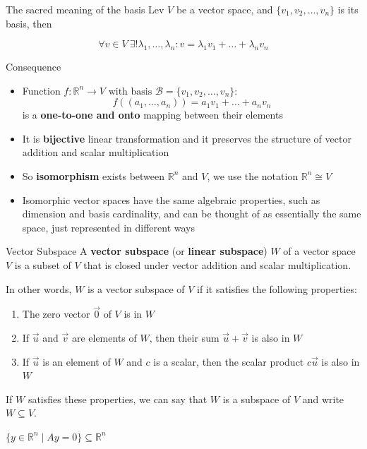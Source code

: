 \documentclass[fullscreen=true, bookmarks=true, hyperref={pdfencoding=unicode}]{beamer}
\begin{document}
\begin{frame}{The sacred meaning of the basis}
  Lev $V$ be a vector space, and $\{v_1, v_2, \ldots, v_n\}$ is its basis, then

  $$\forall v \in V\ \exists! \lambda_1, \ldots, \lambda_n : v = \lambda_1v_1 + \ldots + \lambda_nv_n$$

  \pause
  \begin{block}{Consequence}
    {\small
    \begin{itemize}
      \item Function $f: \mathbb{R}^n \to V \text{ with basis } \mathcal{B} = \{v_1, v_2, \ldots, v_n\}$:
      $$f((a_1, \ldots, a_n)) = a_1v_1 + \ldots + a_nv_n$$ is a \textbf{one-to-one and onto} mapping
      between their elements
      \item It is \textbf{bijective} linear transformation and it preserves 
      the structure of vector addition and scalar multiplication
      \pause
      \item So \textbf{isomorphism} exists between $\mathbb{R}^n$ and $V$, 
      we use the notation $\mathbb{R}^n \cong V$
      \item Isomorphic vector spaces have the same algebraic properties, 
      such as dimension and basis cardinality, 
      and can be thought of as essentially the same space, 
      just represented in different ways
    \end{itemize}
    }
  \end{block}
\end{frame}


\begin{frame}{Vector Subspace}
  A \textbf{vector subspace} (or \textbf{linear subspace}) $W$ of 
  a vector space $V$ is a subset of $V$ that is closed 
  under vector addition and scalar multiplication. 
  
  \pause
  In other words, $W$ is a vector subspace of $V$ if it satisfies the following properties:

  \begin{enumerate}
      \item The zero vector $\vec{0}$ of $V$ is in $W$
      \item If $\vec{u}$ and $\vec{v}$ are elements of $W$, then their sum $\vec{u} + \vec{v}$ is also in $W$
      \item If $\vec{u}$ is an element of $W$ and $c$ is a scalar, then the scalar product $c\vec{u}$ is also in $W$
  \end{enumerate}

  If $W$ satisfies these properties, we can say that $W$ is a subspace 
  of $V$ and write $W \subseteq V$.

  \pause
  \begin{example}
    $\{y \in \mathbb{R}^n \mid Ay = 0\} \subseteq \mathbb{R}^n$
  \end{example}
\end{frame}
\end{document}
